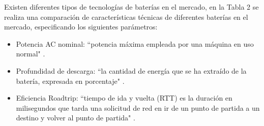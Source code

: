 \begin{table}[htbp]
\end{table}%







Existen diferentes tipos de tecnologías de baterías en el mercado, en la Tabla 2 se realiza una comparación de características técnicas de diferentes baterías en el mercado, especificando los siguientes parámetros:
\begin{itemize}
    \item Potencia AC nominal: ``potencia máxima empleada por una máquina en uso normal" \cite{proyecto_mg}.
    \item Profundidad de descarga: ``la cantidad de energía que se ha extraído de la batería, expresada en porcentaje" \cite{profundidad_descarga}.
    \item Eficiencia Roadtrip: ``tiempo de ida y vuelta (RTT) es la duración en milisegundos que tarda una solicitud de red en ir de un punto de partida a un destino y volver al punto de partida" \cite{tiempo_ida_vuelta}.
\end{itemize}

